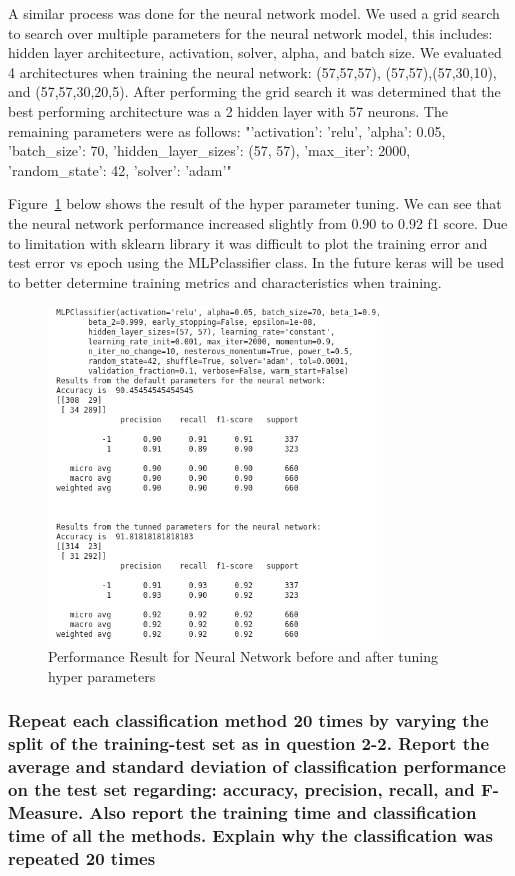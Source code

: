 \clearpage{}
A similar process was done for the neural network model. We used a grid search to search over multiple parameters for the neural network model, this includes: hidden layer architecture, activation, solver, alpha, and batch size. We evaluated 4 architectures when training the neural network: (57,57,57), (57,57),(57,30,10), and (57,57,30,20,5). After performing the grid search it was determined that the best performing architecture was a 2 hidden layer with 57 neurons. The remaining parameters were as follows: "'activation': 'relu', 'alpha': 0.05, 'batch\_size': 70, 'hidden\_layer\_sizes': (57, 57), 'max\_iter': 2000, 'random\_state': 42, 'solver': 'adam'"

Figure~\ref{fig:resulstsnntune} below shows the result of the hyper parameter tuning. We can see that the neural network performance increased slightly from 0.90 to 0.92 f1 score. Due to limitation with sklearn library it was difficult to plot the training error and test error vs epoch using the MLPclassifier class. In the future keras will be used to better determine training metrics and characteristics when training. 

\begin{figure}[!ht]
 \centering
\includegraphics[height=3.5in]{assignment2/2-3-b-nnresult.png}
\caption{\label{fig:resulstsnntune} Performance Result for Neural Network before and after tuning hyper parameters}
\end{figure}




\subsubsection{Repeat each classification method 20 times by varying the split of the training-test set as in question 2-2. Report the average and standard deviation of classification performance on the test set regarding: accuracy, precision, recall, and F- Measure. Also report the training time and classification time of all the methods. Explain why the classification was repeated 20 times}

